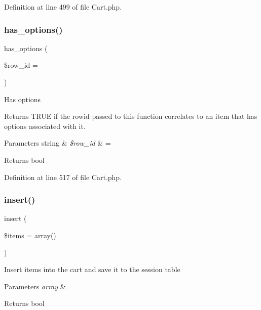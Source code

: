 Definition at line 499 of file Cart.\+php.

\mbox{\label{class_c_i___cart_a276cedf02c823357a2b643a13806f2be}} 
\subsubsection{\texorpdfstring{has\_options()}{has\_options()}}
{\footnotesize\ttfamily has\+\_\+options (\begin{DoxyParamCaption}\item[{}]{\$row\+\_\+id = {\ttfamily \textquotesingle{}\textquotesingle{}} }\end{DoxyParamCaption})}

Has options

Returns T\+R\+UE if the rowid passed to this function correlates to an item that has options associated with it.


\begin{DoxyParams}[1]{Parameters}
string & {\em \$row\+\_\+id} & = \textquotesingle{}\textquotesingle{} \\
\hline
\end{DoxyParams}
\begin{DoxyReturn}{Returns}
bool 
\end{DoxyReturn}


Definition at line 517 of file Cart.\+php.

\mbox{\label{class_c_i___cart_a07488e002c513013079157a9fe61a8e3}} 
\subsubsection{\texorpdfstring{insert()}{insert()}}
{\footnotesize\ttfamily insert (\begin{DoxyParamCaption}\item[{}]{\$items = {\ttfamily array()} }\end{DoxyParamCaption})}

Insert items into the cart and save it to the session table


\begin{DoxyParams}{Parameters}
{\em array} & \\
\hline
\end{DoxyParams}
\begin{DoxyReturn}{Returns}
bool 
\end{DoxyReturn}


